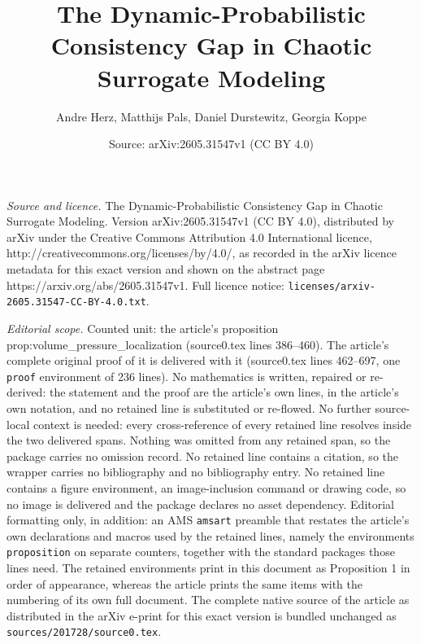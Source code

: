 \documentclass[10pt,a4paper]{amsart}
\title{The Dynamic-Probabilistic Consistency Gap in Chaotic Surrogate Modeling}
\author{Andre Herz, Matthijs Pals, Daniel Durstewitz, Georgia Koppe}
\date{Source: arXiv:2605.31547v1 (CC BY 4.0)}
\begin{document}
\maketitle

\noindent\emph{Source and licence.} The Dynamic-Probabilistic Consistency Gap in Chaotic Surrogate Modeling. Version arXiv:2605.31547v1 (CC BY 4.0), distributed by arXiv under the Creative Commons Attribution 4.0 International licence, http://creativecommons.org/licenses/by/4.0/, as recorded in the arXiv licence metadata for this exact version and shown on the abstract page https://arxiv.org/abs/2605.31547v1. Full licence notice: \texttt{licenses/arxiv-2605.31547-CC-BY-4.0.txt}.\par\smallskip

\noindent\textit{Editorial scope.} Counted unit: the article's proposition prop:volume\_pressure\_localization (source0.tex lines 386--460). The article's complete original proof of it is delivered with it (source0.tex lines 462--697, one \texttt{proof} environment of 236 lines). No mathematics is written, repaired or re-derived: the statement and the proof are the article's own lines, in the article's own notation, and no retained line is substituted or re-flowed.  No further source-local context is needed: every cross-reference of every retained line resolves inside the two delivered spans.  Nothing was omitted from any retained span, so the package carries no omission record.  No retained line contains a citation, so the wrapper carries no bibliography and no bibliography entry.  No retained line contains a figure environment, an image-inclusion command or drawing code, so no image is delivered and the package declares no asset dependency.  Editorial formatting only, in addition: an AMS \texttt{amsart} preamble that restates the article's own declarations and macros used by the retained lines, namely the environments \texttt{proposition} on separate counters, together with the standard packages those lines need.  The retained environments print in this document as Proposition 1 in order of appearance, whereas the article prints the same items with the numbering of its own full document.  The complete native source of the article as distributed in the arXiv e-print for this exact version is bundled unchanged as \texttt{sources/201728/source0.tex}.
\end{document}
